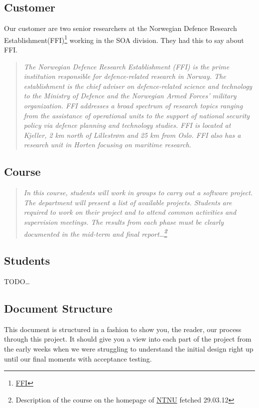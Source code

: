     \subsection{Customer}\label{Customer}
    Our customer are two senior researchers at the Norwegian Defence Research Establishment(FFI)\footnote{\href{http://www.ffi.no/no/Sider/default.aspx}{FFI}} working in the SOA division. They had this to say about FFI.
    \begin{quotation}
    \em The Norwegian Defence Research Establishment (FFI) is the prime institution responsible for defence-related research in Norway. The establishment is the chief adviser on defence-related science and technology to the Ministry of Defence and the Norwegian Armed Forces’ military organization. FFI addresses a broad spectrum of research topics ranging from the assistance of operational units to the support of national security policy via defence planning and technology studies. FFI is located at Kjeller, 2 km north of Lillestrøm and 25 km from Oslo. FFI also has a research unit in Horten focusing on maritime research.
    \end{quotation}
    
    \subsection{Course}\label{Course}
    \begin{quotation}
    \em In this course, students will work in groups to carry out a software project. The department will present a list of available projects. Students are required to work on their project and to attend common activities and supervision meetings. The results from each phase must be clearly documented in the mid-term and final report\ldots\footnote{Description of the course on the homepage of \href{http://www.ntnu.edu/studies/courses/IT2901}{NTNU} fetched 29.03.12}
    \end{quotation}
    
    \subsection{Students}\label{Students}
    TODO\ldots
    
    \subsection{Document Structure}\label{Document Structure}
    This document is structured in a fashion to show you, the reader, our process through this project. It should give you a view into each part of the project from the early weeks when we were struggling to understand the initial design right up until our final moments with acceptance testing. 
    
